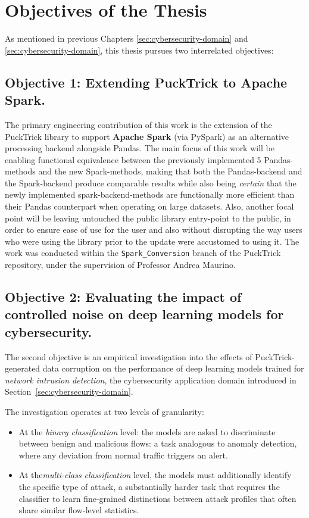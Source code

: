 \documentclass[../main.tex]{subfiles}
\begin{document}
\section{Objectives of the Thesis}
\label{sec:objectives}

As mentioned in previous Chapters \ref{sec:cybersecurity-domain} and \ref{sec:cybersecurity-domain}, this thesis pursues two interrelated objectives:

\subsection{Objective 1: Extending PuckTrick to Apache Spark.}
\label{sec: objective-1}
The primary engineering contribution of this work is the extension of the PuckTrick library to support \textbf{Apache Spark} (via PySpark) as an alternative processing backend alongside Pandas. The main focus of this work will be enabling functional equivalence between the previously implemented 5 Pandas-methods and the new Spark-methods, making that both the Pandas-backend and the Spark-backend produce comparable results while also being \emph{certain} that the newly implemented spark-backend-methods are functionally more efficient than their Pandas counterpart when operating on large datasets. Also, another focal point will be leaving untouched the public library entry-point to the public, in order to ensure ease of use for the user and also without disrupting the way users who were using the library prior to the update were accustomed to using it. The work was conducted within the \texttt{Spark\_Conversion} branch of the PuckTrick repository, under the supervision of Professor Andrea Maurino.



\subsection{Objective 2: Evaluating the impact of controlled noise on deep learning models for cybersecurity.}
\label{sec: objective-2}
The second objective is an empirical investigation into the effects of PuckTrick-generated data corruption on the performance of deep learning models trained for \emph{network intrusion detection}, the cybersecurity application domain introduced in Section~\ref{sec:cybersecurity-domain}.  

The investigation operates at two levels of granularity:
\begin{itemize}
    \item At the \emph{binary classification} level: the models are asked to discriminate between benign and malicious flows: a task analogous to anomaly detection, where any deviation from normal traffic triggers an alert.
    \item   At the\emph{multi-class classification} level, the models must additionally identify the specific type of attack, a substantially harder task that requires the classifier to learn fine-grained distinctions between attack profiles that often share similar flow-level statistics. 
\end{itemize}
\end{document}
